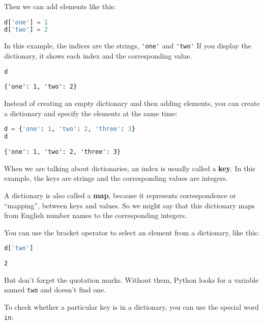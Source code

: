 Then we can add elements like this:

\begin{lstlisting}[language=Python]
d['one'] = 1
d['two'] = 2
\end{lstlisting}

In this example, the indices are the strings,
\passthrough{\lstinline!'one'!} and \passthrough{\lstinline!'two'!} If
you display the dictionary, it shows each index and the corresponding
value.

\begin{lstlisting}[language=Python]
d
\end{lstlisting}

\begin{lstlisting}[]
{'one': 1, 'two': 2}
\end{lstlisting}

Instead of creating an empty dictionary and then adding elements, you
can create a dictionary and specify the elements at the same time:

\begin{lstlisting}[language=Python]
d = {'one': 1, 'two': 2, 'three': 3}
d
\end{lstlisting}

\begin{lstlisting}[]
{'one': 1, 'two': 2, 'three': 3}
\end{lstlisting}

When we are talking about dictionaries, an index is usually called a
\textbf{key}. In this example, the keys are strings and the
corresponding values are integers.

A dictionary is also called a \textbf{map}, because it represents
correspondence or ``mapping'', between keys and values. So we might say
that this dictionary maps from English number names to the corresponding
integers.

You can use the bracket operator to select an element from a dictionary,
like this:

\begin{lstlisting}[language=Python]
d['two']
\end{lstlisting}

\begin{lstlisting}[]
2
\end{lstlisting}

But don't forget the quotation marks. Without them, Python looks for a
variable named \passthrough{\lstinline!two!} and doesn't find one.

To check whether a particular key is in a dictionary, you can use the
special word \passthrough{\lstinline!in!}:

